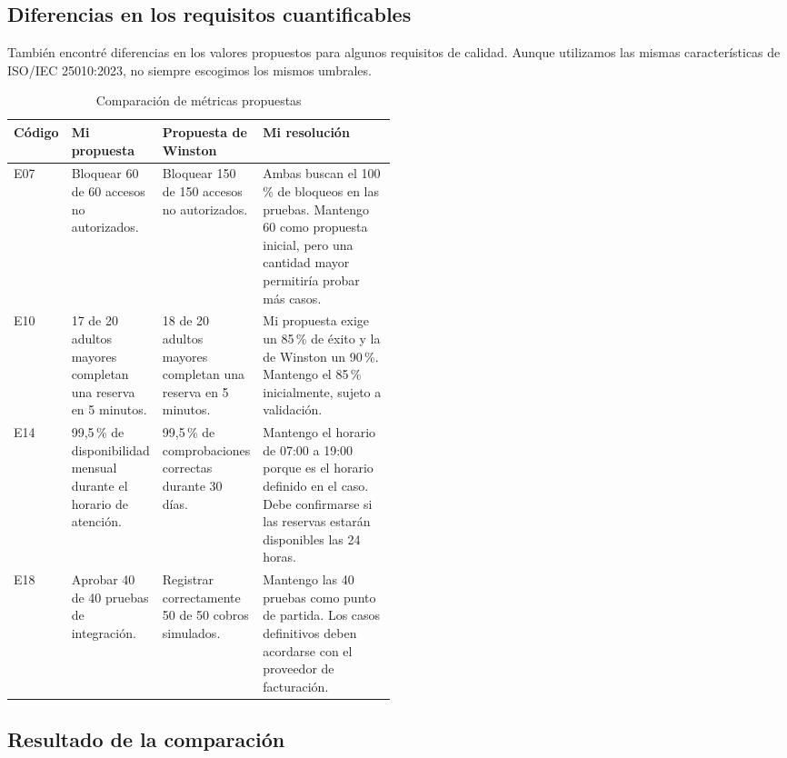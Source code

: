 \documentclass[conference,onecolumn]{IEEEtran}
\begin{document}
\subsection{Diferencias en los requisitos cuantificables}

También encontré diferencias en los valores propuestos para
algunos requisitos de calidad. Aunque utilizamos las mismas
características de ISO/IEC 25010:2023, no siempre escogimos
los mismos umbrales.

\begin{table}[H]
\caption{Comparación de métricas propuestas}
\label{tab:comparacion_metricas}
\centering
\footnotesize
\renewcommand{\arraystretch}{1.3}
\begin{tabularx}{\linewidth}{
@{}p{0.09\linewidth}
p{0.20\linewidth}
p{0.20\linewidth}
Y@{}}
\toprule
\textbf{Código} &
\textbf{Mi propuesta} &
\textbf{Propuesta de Winston} &
\textbf{Mi resolución} \\
\midrule

E07 &
Bloquear 60 de 60 accesos no autorizados. &
Bloquear 150 de 150 accesos no autorizados. &
Ambas buscan el 100\,\% de bloqueos en las pruebas.
Mantengo 60 como propuesta inicial, pero una cantidad
mayor permitiría probar más casos. \\

E10 &
17 de 20 adultos mayores completan una reserva
en 5 minutos. &
18 de 20 adultos mayores completan una reserva
en 5 minutos. &
Mi propuesta exige un 85\,\% de éxito y la de Winston
un 90\,\%. Mantengo el 85\,\% inicialmente,
sujeto a validación. \\

E14 &
99,5\,\% de disponibilidad mensual durante
el horario de atención. &
99,5\,\% de comprobaciones correctas durante 30 días. &
Mantengo el horario de 07:00 a 19:00 porque es
el horario definido en el caso. Debe confirmarse
si las reservas estarán disponibles las 24 horas. \\

E18 &
Aprobar 40 de 40 pruebas de integración. &
Registrar correctamente 50 de 50 cobros simulados. &
Mantengo las 40 pruebas como punto de partida.
Los casos definitivos deben acordarse con
el proveedor de facturación. \\

\bottomrule
\end{tabularx}
\end{table}

\subsection{Resultado de la comparación}
\end{document}
